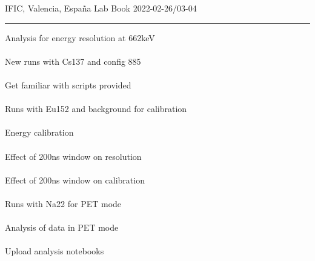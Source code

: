 \begin{center}
  {\Large IFIC, Valencia, España} \hfill {\Large Lab Book} \hfill {\Large 2022-02-26/03-04}\\
  \rule{\textwidth}{1pt}
\end{center}

\begin{minipage}[t][0.45\textheight][t]{0.97\linewidth}
  \begin{minipage}[t]{0.49\textwidth}
    \hspace{10pt}Analysis for energy resolution at 662keV\\~\\
    \hspace{10pt}New runs with Cs137 and config 885\\~\\
    \hspace{10pt}Get familiar with scripts provided\\~\\
    \hspace{10pt}Runs with Eu152 and background for calibration\\~\\
    \hspace{10pt}Energy calibration\\~\\
    \hspace{10pt}Effect of 200ns window on resolution\\~\\
    \hspace{10pt}Effect of 200ns window on calibration\\~\\
    \hspace{10pt}Runs with Na22 for PET mode\\~\\
    \hspace{10pt}Analysis of data in PET mode\\~\\
    \hspace{10pt}Upload analysis notebooks\\~\\
  \end{minipage}
  \begin{minipage}[t]{0.49\textwidth}
    \begin{minipage}[t][0.22\textheight][t]{\textwidth}

\end{minipage}
\end{minipage}
\end{minipage}
